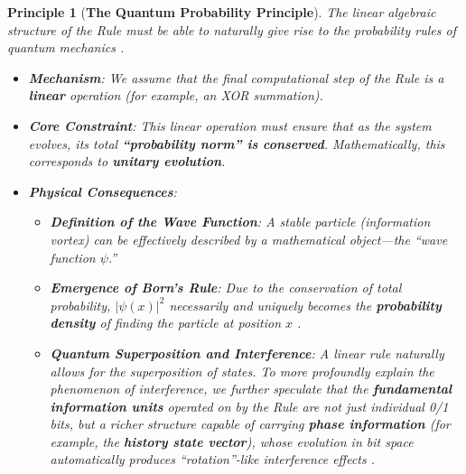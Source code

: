 \documentclass[11pt, a4paper]{article}
\newtheorem{principle}{Principle}[section]  %
\begin{document}
\begin{principle}[\textbf{The Quantum Probability Principle}]
The linear algebraic structure of the Rule must be able to naturally give rise to the probability rules of quantum mechanics \cite{deBroglie1930, Bohm1952}.
\begin{itemize}
    \item \textbf{Mechanism}: We assume that the final computational step of the Rule is a \textbf{linear} operation (for example, an XOR summation).
    \item \textbf{Core Constraint}: This linear operation must ensure that as the system evolves, its total \textbf{``probability norm'' is conserved}. Mathematically, this corresponds to \textbf{unitary evolution}.
    \item \textbf{Physical Consequences}:
    \begin{itemize}
        \item \textbf{Definition of the Wave Function}: A stable particle (information vortex) can be effectively described by a mathematical object—the ``wave function $\psi$.''
        \item \textbf{Emergence of Born's Rule}: Due to the conservation of total probability, $|\psi(x)|^2$ necessarily and uniquely becomes the \textbf{probability density} of finding the particle at position $x$ \cite{deBroglie1930}.
        \item \textbf{Quantum Superposition and Interference}: A linear rule naturally allows for the superposition of states. To more profoundly explain the phenomenon of interference, we further speculate that the \textbf{fundamental information units} operated on by the Rule are not just individual 0/1 bits, but a richer structure capable of carrying \textbf{phase information} (for example, the \textbf{history state vector}), whose evolution in bit space automatically produces ``rotation''-like interference effects \cite{deBroglie1930}.
    \end{itemize}
\end{itemize}
\end{principle}
\end{document}
